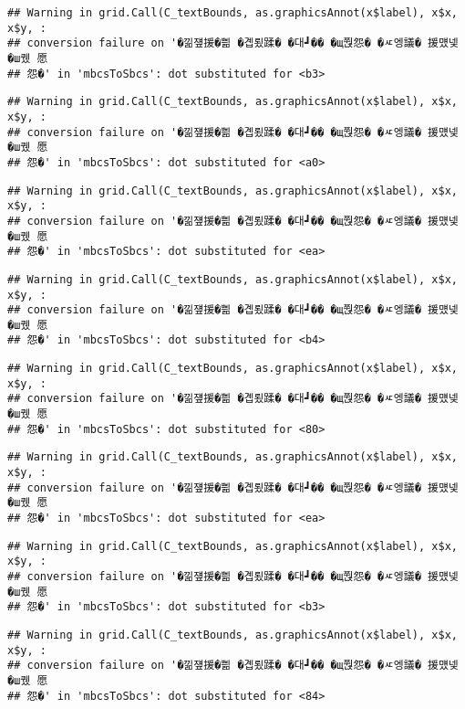 \documentclass[
]{article}
\begin{document}
\begin{verbatim}
## Warning in grid.Call(C_textBounds, as.graphicsAnnot(x$label), x$x, x$y, :
## conversion failure on '�낆쟾援�쁾 �곕룄蹂� �대┛�� �щ쭩怨� �ㅼ엥議� 援먰넻�ш퀬 愿
## 怨�' in 'mbcsToSbcs': dot substituted for <b3>
\end{verbatim}

\begin{verbatim}
## Warning in grid.Call(C_textBounds, as.graphicsAnnot(x$label), x$x, x$y, :
## conversion failure on '�낆쟾援�쁾 �곕룄蹂� �대┛�� �щ쭩怨� �ㅼ엥議� 援먰넻�ш퀬 愿
## 怨�' in 'mbcsToSbcs': dot substituted for <a0>
\end{verbatim}

\begin{verbatim}
## Warning in grid.Call(C_textBounds, as.graphicsAnnot(x$label), x$x, x$y, :
## conversion failure on '�낆쟾援�쁾 �곕룄蹂� �대┛�� �щ쭩怨� �ㅼ엥議� 援먰넻�ш퀬 愿
## 怨�' in 'mbcsToSbcs': dot substituted for <ea>
\end{verbatim}

\begin{verbatim}
## Warning in grid.Call(C_textBounds, as.graphicsAnnot(x$label), x$x, x$y, :
## conversion failure on '�낆쟾援�쁾 �곕룄蹂� �대┛�� �щ쭩怨� �ㅼ엥議� 援먰넻�ш퀬 愿
## 怨�' in 'mbcsToSbcs': dot substituted for <b4>
\end{verbatim}

\begin{verbatim}
## Warning in grid.Call(C_textBounds, as.graphicsAnnot(x$label), x$x, x$y, :
## conversion failure on '�낆쟾援�쁾 �곕룄蹂� �대┛�� �щ쭩怨� �ㅼ엥議� 援먰넻�ш퀬 愿
## 怨�' in 'mbcsToSbcs': dot substituted for <80>
\end{verbatim}

\begin{verbatim}
## Warning in grid.Call(C_textBounds, as.graphicsAnnot(x$label), x$x, x$y, :
## conversion failure on '�낆쟾援�쁾 �곕룄蹂� �대┛�� �щ쭩怨� �ㅼ엥議� 援먰넻�ш퀬 愿
## 怨�' in 'mbcsToSbcs': dot substituted for <ea>
\end{verbatim}

\begin{verbatim}
## Warning in grid.Call(C_textBounds, as.graphicsAnnot(x$label), x$x, x$y, :
## conversion failure on '�낆쟾援�쁾 �곕룄蹂� �대┛�� �щ쭩怨� �ㅼ엥議� 援먰넻�ш퀬 愿
## 怨�' in 'mbcsToSbcs': dot substituted for <b3>
\end{verbatim}

\begin{verbatim}
## Warning in grid.Call(C_textBounds, as.graphicsAnnot(x$label), x$x, x$y, :
## conversion failure on '�낆쟾援�쁾 �곕룄蹂� �대┛�� �щ쭩怨� �ㅼ엥議� 援먰넻�ш퀬 愿
## 怨�' in 'mbcsToSbcs': dot substituted for <84>
\end{verbatim}
\end{document}
